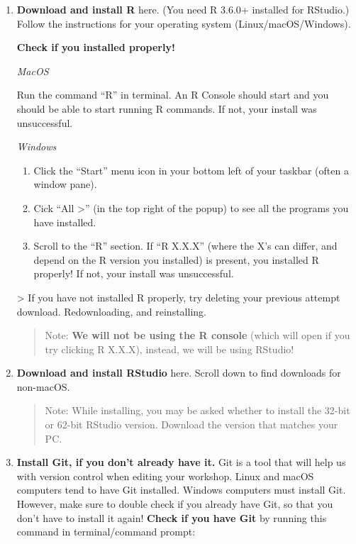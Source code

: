\documentclass[
]{book}
\providecommand{\tightlist}{%
  \setlength{\itemsep}{0pt}\setlength{\parskip}{0pt}}
\newenvironment{greenbox}{
  \definecolor{shadecolor}{RGB}{141, 181, 128}
  \color{white}
  \begin{shaded}}
 {\end{shaded}}
\theoremstyle{definition}
\theoremstyle{definition}
\theoremstyle{definition}
\theoremstyle{definition}
\theoremstyle{remark}
\begin{document}
\begin{enumerate}
\def\labelenumi{\arabic{enumi}.}
\item
  \textbf{Download and install R} here. (You need R 3.6.0+ installed for RStudio.) Follow the instructions for your operating system (Linux/macOS/Windows).

  \begin{greenbox}

  \begin{center}
  \textbf{Check if you installed properly!}

  \end{center}

  \emph{MacOS}

  Run the command ``R'' in terminal. An R Console should start and you should be able to start running R commands. If not, your install was unsuccessful.

  \emph{Windows}

  \begin{enumerate}
  \def\labelenumii{\arabic{enumii}.}
  \tightlist
  \item
    Click the ``Start'' menu icon in your bottom left of your taskbar (often a window pane).
  \item
    Cick ``All \textgreater{}'' (in the top right of the popup) to see all the programs you have installed.
  \item
    Scroll to the ``R'' section. If ``R X.X.X'' (where the X's can differ, and depend on the R version you installed) is present, you installed R properly! If not, your install was unsuccessful.
  \end{enumerate}

  \textgreater{} If you have not installed R properly, try deleting your previous attempt download. Redownloading, and reinstalling.

  \end{greenbox}

  \begin{quote}
  Note: \textbf{We will not be using the R console} (which will open if you try clicking R X.X.X), instead, we will be using RStudio!
  \end{quote}
\item
  \textbf{Download and install RStudio} here. Scroll down to find downloads for non-macOS.

  \begin{quote}
  Note: While installing, you may be asked whether to install the 32-bit or 62-bit RStudio version. Download the version that matches your PC.
  \end{quote}
\item
  \textbf{Install Git, if you don't already have it.} Git is a tool that will help us with version control when editing your workshop. Linux and macOS computers tend to have Git installed. Windows computers must install Git. However, make sure to double check if you already have Git, so that you don't have to install it again! \textbf{Check if you have Git} by running this command in terminal/command prompt:


\end{enumerate}
\end{document}
